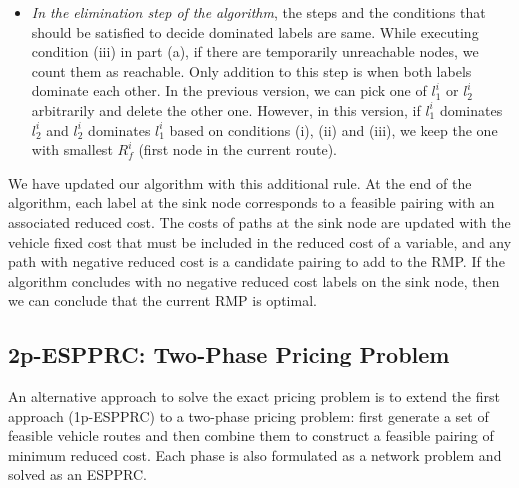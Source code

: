 \begin{itemize}
\item {\em In the elimination step of the algorithm}, the steps and the conditions that
should be satisfied to decide dominated labels are same. While executing condition 
(iii) in part (a), if there are temporarily unreachable nodes, we count them 
as reachable. Only addition to this step is when both labels dominate each other.
In the previous version, we can pick one of  $l^i_1$ or  $l^i_2$  arbitrarily 
and delete the other one. However, in this version, if  $l^i_1$ dominates 
$l^i_2$ and $l^i_2$ dominates $l^i_1$ based on conditions (i), (ii) and 
(iii), we keep the one with smallest $R^i_{f}$ (first node in the current route).  
\end{itemize}

We have updated our algorithm with this additional rule. 
At the end of the algorithm, each label at the sink node corresponds to a 
feasible pairing with an associated reduced cost. The costs of paths at the sink 
node are updated with the vehicle fixed cost that must be included in the
reduced cost of a variable, and any path with negative reduced cost is a 
candidate pairing to add to the RMP. 
If the algorithm concludes with no negative reduced cost labels on the sink node, 
then we can conclude that the current RMP is optimal. 


\subsection{2p-ESPPRC: Two-Phase Pricing Problem}
An alternative approach to solve the exact pricing problem is to extend the first 
approach (1p-ESPPRC) to a two-phase pricing problem: first generate a set of feasible 
vehicle routes and then combine them to construct a feasible pairing of minimum 
reduced cost. Each phase is also formulated as a network problem and solved as an ESPPRC.

